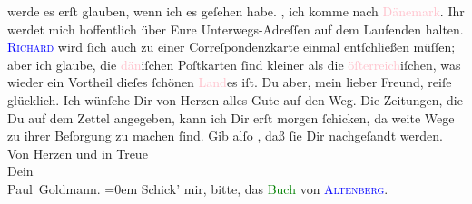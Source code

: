                werde es erſt glauben, wenn ich es geſehen habe.\pend
           \pstart
           \label{K_L02779-2v}\label{K_L02779-2h},
               ich komme nach \textcolor{pink}{Dänemark}{}\ledrightnote{\textcolor{pink}{Dänemark}}. Ihr werdet mich
               hoffentlich über Eure Unterwegs-Adreſſen auf dem Laufenden halten. \textsc{\textcolor{blue}{Richard}{}\ledrightnote{\textcolor{blue}{Richard Beer-Hofmann}}} wird ſich auch zu einer Correſpondenzkarte einmal entſchließen {\pb}müſſen; aber ich glaube, die \textcolor{pink}{dän}{}iſchen Poſtkarten ſind kleiner als die
                  \textcolor{pink}{öſterreich}{}iſchen, was
               wieder ein Vortheil dieſes ſchönen \textcolor{pink}{Land}{}es iſt.\pend
           \pstart
           Du aber, mein lieber Freund, reiſe glücklich. Ich wünſche Dir von Herzen alles Gute
               auf den Weg.\pend
           \pstart
           Die Zeitungen, die Du auf dem Zettel angegeben, kann ich Dir erſt morgen ſchicken, da weite Wege zu ihrer Beſorgung zu
               machen ſind. Gib alſo \label{K_L02779-3v}\label{K_L02779-3h}, daß ſie Dir nachgeſandt werden.\pend
           \pstart
           Von Herzen und in Treue{\\[\baselineskip]}Dein{\\[\baselineskip]}\spacefill\mbox{Paul Goldmann.}\pend
           \leftskip=0em{}\pstart
           \noindent{}Schick’ mir, bitte, das \textcolor{green}{Buch}{}
                  von \textsc{\textcolor{blue}{Altenberg}{}\ledrightnote{\textcolor{blue}{Peter Altenberg}}}.\pend
           \endnumbering{}  
      